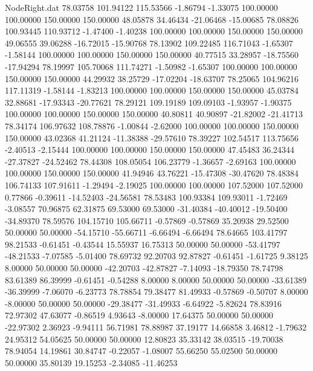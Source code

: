 \begin{filecontents}{NodeRight.dat}
  78.03758  101.94122  115.53566    -1.86794   -1.33075  100.00000  100.00000  150.00000  150.00000   48.05878   34.46434  -21.06468  -15.00685
  78.08826  100.93445  110.93712    -1.47400   -1.40238  100.00000  100.00000  150.00000  150.00000   49.06555   39.06288  -16.72015  -15.90768
  78.13902  109.22485  116.71043    -1.65307   -1.58144  100.00000  100.00000  150.00000  150.00000   40.77515   33.28957  -18.75560  -17.94294
  78.19997  105.70068  111.74271    -1.50982   -1.65307  100.00000  100.00000  150.00000  150.00000   44.29932   38.25729  -17.02204  -18.63707
  78.25065  104.96216  117.11319    -1.58144   -1.83213  100.00000  100.00000  150.00000  150.00000   45.03784   32.88681  -17.93343  -20.77621
  78.29121  109.19189  109.09103    -1.93957   -1.90375  100.00000  100.00000  150.00000  150.00000   40.80811   40.90897  -21.82002  -21.41713
  78.34174  106.97632  108.78876    -1.00844   -2.62000  100.00000  100.00000  150.00000  150.00000   43.02368   41.21124  -11.38388  -29.57610
  78.39227  102.54517  113.75656    -2.40513   -2.15444  100.00000  100.00000  150.00000  150.00000   47.45483   36.24344  -27.37827  -24.52462
  78.44308  108.05054  106.23779    -1.36657   -2.69163  100.00000  100.00000  150.00000  150.00000   41.94946   43.76221  -15.47308  -30.47620
  78.48384  106.74133  107.91611    -1.29494   -2.19025  100.00000  100.00000  107.52000  107.52000    0.77866   -0.39611  -14.52403  -24.56581
  78.53483  100.93384  109.93011    -1.72469   -3.08557   70.96875   62.31875   69.53000   69.53000  -31.40384  -40.40012  -19.50400  -34.89370
  78.59576  104.15710  105.66711    -0.57869   -0.57869   35.20938   29.52500   50.00000   50.00000  -54.15710  -55.66711   -6.66494   -6.66494
  78.64665  103.41797   98.21533    -0.61451   -0.43544   15.55937   16.75313   50.00000   50.00000  -53.41797  -48.21533   -7.07585   -5.01400
  78.69732   92.20703   92.87827    -0.61451   -1.61725    9.38125    8.00000   50.00000   50.00000  -42.20703  -42.87827   -7.14093  -18.79350
  78.74798   83.61389   86.39999    -0.61451   -0.54288    8.00000    8.00000   50.00000   50.00000  -33.61389  -36.39999   -7.06070   -6.23773
  78.78854   79.38477   81.49933    -0.57869   -0.50707    8.00000   -8.00000   50.00000   50.00000  -29.38477  -31.49933   -6.64922   -5.82624
  78.83916   72.97302   47.63077    -0.86519    4.93643   -8.00000   17.64375   50.00000   50.00000  -22.97302    2.36923   -9.94111   56.71981
  78.88987   37.19177   14.66858     3.46812   -1.79632   24.95312   54.05625   50.00000   50.00000   12.80823   35.33142   38.03515  -19.70038
  78.94054   14.19861   30.84747    -0.22057   -1.08007   55.66250   55.02500   50.00000   50.00000   35.80139   19.15253   -2.34085  -11.46253

\end{filecontents}
